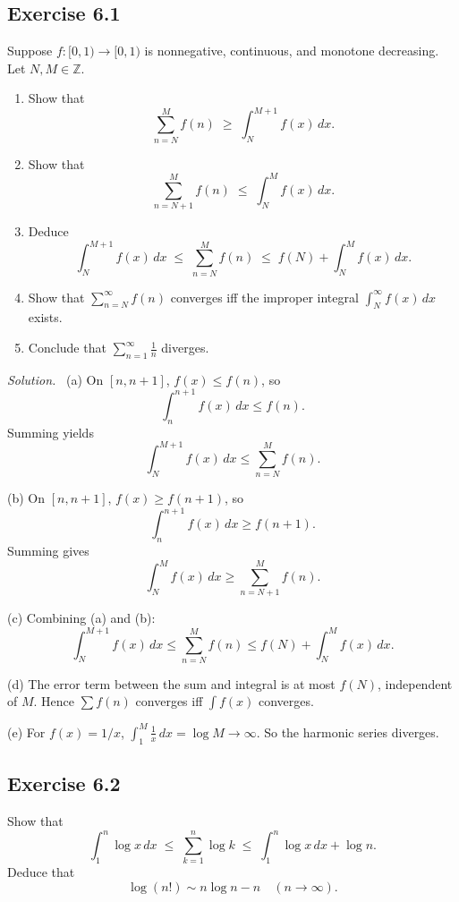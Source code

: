 \documentclass[11pt,a4paper]{article}
\newenvironment{solution}{\par\noindent\textit{Solution.}\ }{\par\vspace{0.5em}}
\begin{document}
\subsection*{Exercise 6.1}
Suppose $f:[0,1)\to[0,1)$ is nonnegative, continuous, and monotone decreasing. 
Let $N,M\in\mathbb{Z}$.

\begin{enumerate}[label=\alph*)]
	\item Show that
	\[
	\sum_{n=N}^M f(n)\;\geq\;\int_N^{M+1} f(x)\,dx.
	\]
	
	\item Show that
	\[
	\sum_{n=N+1}^M f(n)\;\leq\;\int_N^M f(x)\,dx.
	\]
	
	\item Deduce
	\[
	\int_N^{M+1} f(x)\,dx \;\leq\; \sum_{n=N}^M f(n)\;\leq\; f(N)+\int_N^M f(x)\,dx.
	\]
	
	\item Show that $\sum_{n=N}^\infty f(n)$ converges iff the improper integral 
	$\int_N^\infty f(x)\,dx$ exists.
	
	\item Conclude that $\sum_{n=1}^\infty \tfrac{1}{n}$ diverges.
\end{enumerate}

\begin{solution}
	(a) On $[n,n+1]$, $f(x)\leq f(n)$, so
	\[
	\int_n^{n+1} f(x)\,dx \leq f(n).
	\]
	Summing yields
	\[
	\int_N^{M+1} f(x)\,dx \leq \sum_{n=N}^M f(n).
	\]
	
	(b) On $[n,n+1]$, $f(x)\geq f(n+1)$, so
	\[
	\int_n^{n+1} f(x)\,dx \geq f(n+1).
	\]
	Summing gives
	\[
	\int_N^M f(x)\,dx \geq \sum_{n=N+1}^M f(n).
	\]
	
	(c) Combining (a) and (b):
	\[
	\int_N^{M+1} f(x)\,dx \leq \sum_{n=N}^M f(n) \leq f(N)+\int_N^M f(x)\,dx.
	\]
	
	(d) The error term between the sum and integral is at most $f(N)$, independent of $M$. 
	Hence $\sum f(n)$ converges iff $\int f(x)$ converges.
	
	(e) For $f(x)=1/x$, $\int_1^M \frac{1}{x}\,dx=\log M\to\infty$. 
	So the harmonic series diverges.
\end{solution}


\subsection*{Exercise 6.2}
Show that
\[
\int_1^n \log x \, dx \;\leq\; \sum_{k=1}^n \log k \;\leq\; \int_1^n \log x \, dx + \log n.
\]
Deduce that
\[
\log(n!) \sim n\log n - n \quad (n\to\infty).
\]
\end{document}

